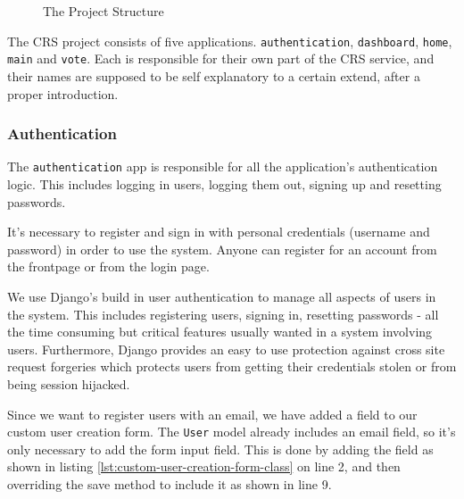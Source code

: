 \begin{figure}[H]
    \caption{The Project Structure}
    \label{fig:project-structure}
\end{figure}

The CRS project consists of five applications. \texttt{authentication}, \texttt{dashboard}, \texttt{home}, \texttt{main} and \texttt{vote}. Each is responsible for their own part of the CRS service, and their names are supposed to be self explanatory to a certain extend, after a proper introduction.

\subsubsection*{Authentication}
The \texttt{authentication} app is responsible for all the application's authentication logic. This includes logging in users, logging them out, signing up and resetting passwords.

It's necessary to register and sign in with personal credentials (username and password) in order to use the system. Anyone can register for an account from the frontpage or from the login page.

We use Django's build in user authentication to manage all aspects of users in the system. This includes registering users, signing in, resetting passwords - all the time consuming but critical features usually wanted in a system involving users. Furthermore, Django provides an easy to use protection against cross site request forgeries which protects users from getting their credentials stolen or from being session hijacked.

Since we want to register users with an email, we have added a field to our custom user creation form. The \texttt{User} model already includes an email field, so it's only necessary to add the form input field. This is done by adding the field as shown in listing \ref{lst:custom-user-creation-form-class} on line 2, and then overriding the save method to include it as shown in line 9.


